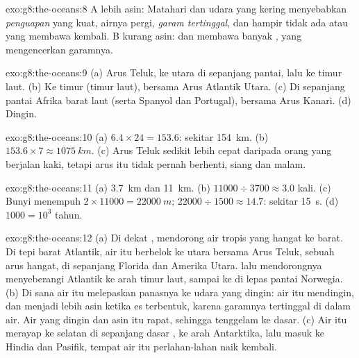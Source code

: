 \begin{solution}{exo:g8:the-oceans:8}
 A lebih asin: Matahari dan udara yang kering menyebabkan
\emph{penguapan} yang kuat, airnya pergi, \emph{garam tertinggal}, dan
hampir tidak ada  atau  yang membawa \emph{} kembali.
 B kurang asin:  dan  membawa banyak
\emph{}, yang mengencerkan garamnya.
\end{solution}

\begin{solution}{exo:g8:the-oceans:9}
(a) Arus Teluk, ke utara di sepanjang pantai, lalu ke timur laut. (b) Ke
timur (timur laut), bersama Arus Atlantik Utara. (c) Di sepanjang pantai
Afrika barat laut (serta Spanyol dan Portugal), bersama Arus Kanari.
(d) Dingin.
\end{solution}

\begin{solution}{exo:g8:the-oceans:10}
(a) $6.4 \times 24 = 153.6$: sekitar \qty{154}{km}. (b) $153.6 \times 7
\approx \qty{1075}{km}$. (c) Arus Teluk sedikit lebih cepat daripada
orang yang berjalan kaki, tetapi arus itu tidak pernah berhenti, siang
dan malam.
\end{solution}

\begin{solution}{exo:g8:the-oceans:11}
(a) \qty{3.7}{km} dan \qty{11}{km}. (b) $11000 \div 3700 \approx 3.0$
kali. (c) Bunyi menempuh $2 \times 11000 = \qty{22000}{m}$; $22000
\div 1500 \approx 14.7$: sekitar \qty{15}{s}. (d) $1000 = 10^3$ tahun.
\end{solution}

\begin{solution}{exo:g8:the-oceans:12}
(a) Di dekat ,  mendorong air tropis yang hangat ke
barat. Di tepi barat Atlantik, air itu berbelok ke utara bersama Arus
Teluk, sebuah arus hangat, di sepanjang Florida dan Amerika Utara.  lalu mendorongnya menyeberangi Atlantik ke arah timur laut,
sampai ke  di lepas pantai Norwegia. (b) Di sana air itu
melepaskan panasnya ke udara yang dingin: air itu mendingin, dan menjadi
lebih asin ketika es  terbentuk, karena garamnya tertinggal di dalam
air. Air yang dingin dan asin itu rapat, sehingga tenggelam ke dasar.
(c) Air itu merayap ke selatan di sepanjang dasar , ke arah
Antarktika, lalu masuk ke  Hindia dan  Pasifik, tempat air
itu perlahan-lahan naik kembali.
\end{solution}

